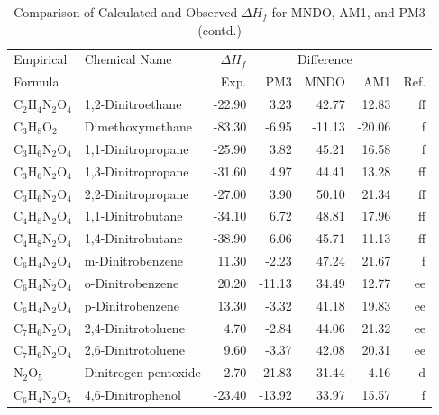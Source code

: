 \begin{table}
\caption{Comparison of Calculated and Observed $\Delta H_f$ 
for MNDO, AM1, and PM3 (contd.)}
\begin{center}
\compresstable
\begin{tabular}{llrrrrr}
Empirical & Chemical Name & $\Delta H_f$ & \multicolumn{3}{c}{Difference} & \\
Formula   &               & Exp. & PM3 &  MNDO  &  AM1 &     Ref.\\
\hline
 C$_2$H$_4$N$_2$O$_4$    & 1,2-Dinitroethane               &   -22.90    &     3.23  &    42.77  &    12.83  &     ff\\
 C$_3$H$_8$O$_2$      & Dimethoxymethane                &   -83.30    &    -6.95  &   -11.13  &   -20.06  &      f\\
 C$_3$H$_6$N$_2$O$_4$    & 1,1-Dinitropropane              &   -25.90    &     3.82  &    45.21  &    16.58  &      f\\
 C$_3$H$_6$N$_2$O$_4$    & 1,3-Dinitropropane              &   -31.60    &     4.97  &    44.41  &    13.28  &     ff\\
 C$_3$H$_6$N$_2$O$_4$    & 2,2-Dinitropropane              &   -27.00    &     3.90  &    50.10  &    21.34  &     ff\\
 C$_4$H$_8$N$_2$O$_4$    & 1,1-Dinitrobutane               &   -34.10    &     6.72  &    48.81  &    17.96  &     ff\\
 C$_4$H$_8$N$_2$O$_4$    & 1,4-Dinitrobutane               &   -38.90    &     6.06  &    45.71  &    11.13  &     ff\\
 C$_6$H$_4$N$_2$O$_4$    & m-Dinitrobenzene                &    11.30    &    -2.23  &    47.24  &    21.67  &      f\\
 C$_6$H$_4$N$_2$O$_4$    & o-Dinitrobenzene                &    20.20    &   -11.13  &    34.49  &    12.77  &     ee\\
 C$_6$H$_4$N$_2$O$_4$    & p-Dinitrobenzene                &    13.30    &    -3.32  &    41.18  &    19.83  &     ee\\
 C$_7$H$_6$N$_2$O$_4$    & 2,4-Dinitrotoluene              &     4.70    &    -2.84  &    44.06  &    21.32  &     ee\\
 C$_7$H$_6$N$_2$O$_4$    & 2,6-Dinitrotoluene              &     9.60    &    -3.37  &    42.08  &    20.31  &     ee\\
 N$_2$O$_5$        & Dinitrogen pentoxide            &     2.70    &   -21.83  &    31.44  &     4.16  &      d\\
 C$_6$H$_4$N$_2$O$_5$    & 4,6-Dinitrophenol               &   -23.40    &   -13.92  &    33.97  &    15.57  &      f\\

\end{tabular}
\end{center}
\end{table}
